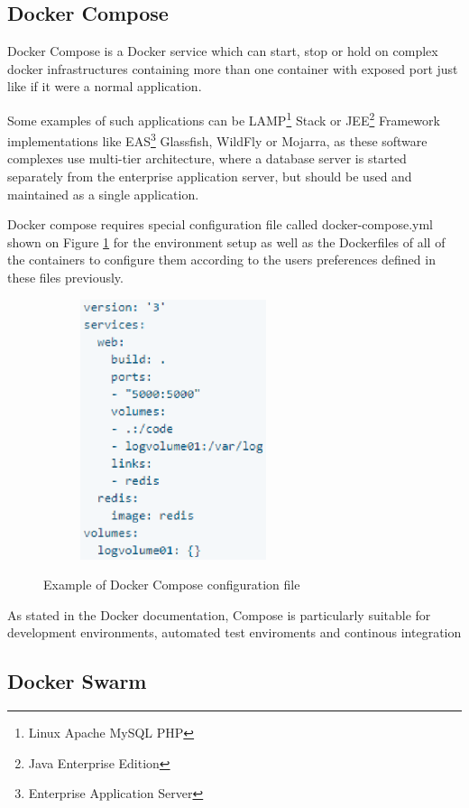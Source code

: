 \subsection{Docker Compose}

Docker Compose is a Docker service which can start,
stop or hold on complex docker infrastructures
containing more than one container with exposed port
just like if it were a normal application\cite{DockerCompose}.

Some examples of such applications
can be LAMP\footnote{Linux Apache MySQL PHP} Stack
or JEE\footnote{Java Enterprise Edition} Framework
implementations like EAS\footnote{Enterprise Application Server}
Glassfish, WildFly or Mojarra, as these software
complexes use multi-tier architecture, where a database server is
started separately from the enterprise application server,
but should be used and maintained as a single application.

Docker compose requires special configuration file called
docker-compose.yml shown on Figure \ref{fig:DockerComposeFilePic}
for the environment setup
as well as the Dockerfiles of all of the
containers to configure them according to the users
preferences defined in these files previously\cite{DockerCompose}.

\begin{figure}
\includegraphics[height=3in, width=3in]{DockerComposeExample}
\caption{Example of Docker Compose configuration file}
\cite{DockerComposeFilePic}
\label{fig:DockerComposeFilePic}
\end{figure}

As stated in the Docker documentation, Compose is particularly suitable
for development environments,
automated test enviroments and continous integration

\subsection{Docker Swarm}

